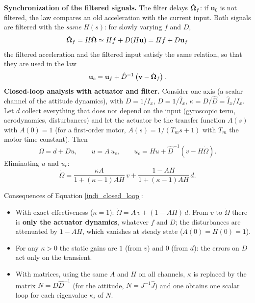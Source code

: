 \documentclass[10pt, a4paper]{report}
\begin{document}
\noindent\textbf{Synchronization of the filtered signals.} The filter delays $\dot{{\boldsymbol{\Omega}}}_f$: if $\mathbf u_0$ is not filtered, the law compares an old acceleration with the current input. Both signals are filtered with the \textit{same} $H(s)$: for slowly varying $f$ and $D$,\begin{equation}
    \dot{{\boldsymbol{\Omega}}}_f=H\dot{{\boldsymbol{\Omega}}}\simeq Hf+D(H\mathbf u)=Hf+D\mathbf u_f
\end{equation}
the filtered acceleration and the filtered input satisfy the same relation, so that they are used in the law
\begin{equation}\label{indi_sync_law}
    \mathbf u_c=\mathbf u_f+\hat D^{-1}\left(\mathbf v-\dot{{\boldsymbol{\Omega}}}_f\right).
\end{equation}
\noindent\textbf{Closed-loop analysis with actuator and filter.} Consider one axis (a scalar channel of the attitude dynamics), with $D=1/I_x$, $\hat D=1/\hat I_x$, $\kappa=D/\hat D=\hat I_x/I_x$. Let $d$ collect everything that does not depend on the input (gyroscopic term, aerodynamics, disturbances) and let the actuator be the transfer function $A(s)$ with $A(0)=1$ (for a first-order motor, $A(s)=1/(T_ms+1)$ with $T_m$ the motor time constant). Then
\begin{equation}
    \dot\Omega=d+Du,\qquad u=A\,u_c,\qquad u_c=Hu+\hat D^{-1}(v-H\dot\Omega).
\end{equation}
Eliminating $u$ and $u_c$:\begin{equation}\label{indi_closed_loop}
    \dot\Omega=\frac{\kappa A}{1+(\kappa-1)AH}\,v+\frac{1-AH}{1+(\kappa-1)AH}\,d.
\end{equation}
\begin{boxobservation}{}{}
Consequences of Equation \eqref{indi_closed_loop}:\begin{itemize}
    \item With exact effectiveness ($\kappa=1$): $\dot\Omega=A\,v+(1-AH)\,d$. From $v$ to $\dot\Omega$ there is \textbf{only the actuator dynamics}, whatever $f$ and $D$; the disturbances are attenuated by $1-AH$, which vanishes at steady state ($A(0)=H(0)=1$).
    \item For any $\kappa>0$ the static gains are $1$ (from $v$) and $0$ (from $d$): the errors on $D$ act only on the transient.
    \item With matrices, using the same $A$ and $H$ on all channels, $\kappa$ is replaced by the matrix $N=D\hat D^{-1}$ (for the attitude, $N=J^{-1}\hat J$) and one obtains one scalar loop for each eigenvalue $\kappa_i$ of $N$.
\end{itemize}
\end{boxobservation}
\end{document}
